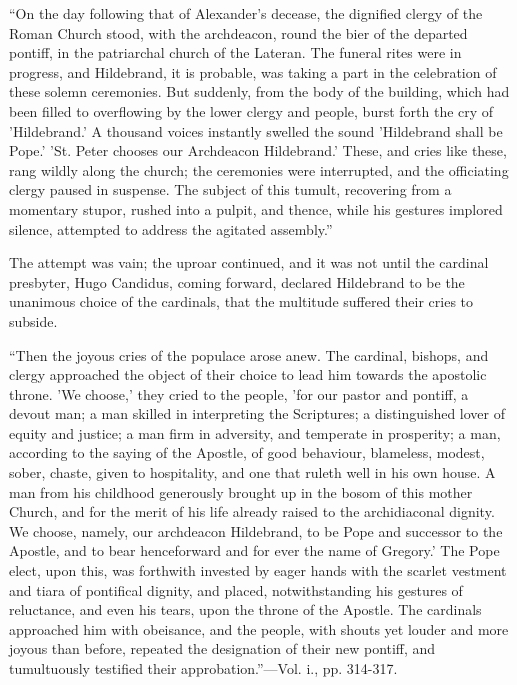 ``On
the day following that of Alexander's decease, the dignified clergy of
the Roman Church stood, with the archdeacon, round the bier of the
departed pontiff, in the patriarchal church of the Lateran. The
funeral rites were in progress, and Hildebrand, it is probable, was
taking a part in the celebration of these solemn ceremonies. But
suddenly, from the body of the building, which had been filled to
overflowing by the lower clergy and people, burst forth the cry of
'Hildebrand.' A thousand voices instantly swelled the sound
'Hildebrand shall be Pope.' 'St. Peter chooses our Archdeacon
Hildebrand.' These, and cries like these, rang wildly along the
church; the ceremonies were interrupted, and the officiating clergy
paused in suspense. The subject of this tumult, recovering from a
momentary stupor, rushed into a pulpit, and thence, while his gestures
implored silence, attempted to address the agitated assembly.''

The attempt was vain; the uproar continued, and
it was not until the cardinal presbyter, Hugo Candidus, coming
forward, declared Hildebrand to be the unanimous choice of the
cardinals, that the multitude suffered their cries to subside.

``Then the
joyous cries of the populace arose anew. The cardinal, bishops, and clergy approached the object of their choice to lead him
towards the apostolic throne. 'We choose,' they cried to the people,
'for our pastor and pontiff, a devout man; a man skilled in
interpreting the Scriptures; a distinguished lover of equity and
justice; a man firm in adversity, and temperate in prosperity; a man,
according to the saying of the Apostle, of good behaviour, blameless,
modest, sober, chaste, given to hospitality, and one that ruleth well
in his own house. A man from his childhood generously brought up in
the bosom of this mother Church, and for the merit of his life already
raised to the archidiaconal dignity. We choose, namely, our archdeacon
Hildebrand, to be Pope and successor to the Apostle, and to bear
henceforward and for ever the name of Gregory.' The Pope elect, upon
this, was forthwith invested by eager hands with the scarlet vestment
and tiara of pontifical dignity, and placed, notwithstanding his
gestures of reluctance, and even his tears, upon the throne of the
Apostle. The cardinals approached him with obeisance, and the people,
with shouts yet louder and more joyous than before, repeated the
designation of their new pontiff, and tumultuously testified their
approbation.''—Vol. i., pp. 314-317.

